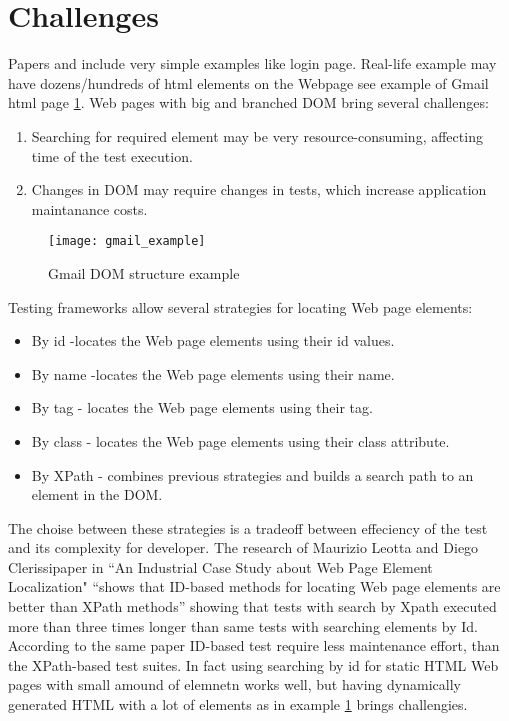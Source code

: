 	\section {Challenges}
	\label {sec:challenges}
		Papers \cite{Xu1} \cite{Zhongen2} and \cite{testGen3} include very simple
		examples like login page. Real-life example may have dozens/hundreds of html
		elements on the Webpage see example of Gmail html page \ref{fig:gmailexample}.
		Web pages with big and branched DOM bring several challenges:
		\begin{enumerate}
		  \item Searching for required element may be very resource-consuming,
		  affecting time of the test execution. 
		  \item Changes in DOM may require changes in tests, which increase
		  application maintanance costs.
		\end{enumerate}
		
		\begin{figure}
		\label{fig:gmailexample}
		\texttt{[image: gmail\_example]}
		\caption{Gmail DOM structure example}
		\end{figure}
		
		Testing frameworks allow several strategies for locating Web page elements:
		\begin{itemize}
		  \item By id -locates the Web page elements using their id values.
		  \item By name -locates the Web page elements using their name.
		  \item By tag - locates the Web page elements using their tag.
		  \item By class - locates the Web page elements using their class attribute.
		  \item By XPath - combines previous strategies and builds a search
		  path to an element in the DOM.
		\end{itemize}
		
		The choise between these strategies is a tradeoff between effeciency of the
		test and its complexity for developer. The research of Maurizio Leotta
		and Diego Clerissipaper in ``An Industrial Case Study about Web Page Element
		Localization" ``shows that ID-based methods for locating Web page elements are
		better than XPath methods''\cite{selenium4} showing that tests with search by
		Xpath executed more than three times longer than same tests with searching
		elements by Id. According to the same paper ID-based test require less
		maintenance effort, than the XPath-based test suites. In fact using searching by id for static HTML Web pages with small
		amound of elemnetn works well, but having dynamically generated HTML with 
		a lot of elements as in example \ref{fig:gmailexample} brings challengies.
		
